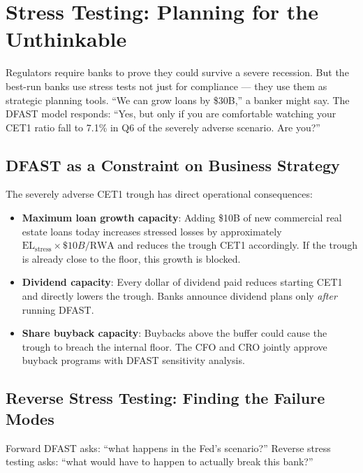 \documentclass[12pt,a4paper]{article}
\begin{document}
\section{Stress Testing: Planning for the Unthinkable}

Regulators require banks to prove they could survive a severe recession.
But the best-run banks use stress tests not just for compliance --- they use
them as strategic planning tools.  ``We can grow loans by \$30B,'' a banker
might say.  The DFAST model responds: ``Yes, but only if you are comfortable
watching your CET1 ratio fall to 7.1\% in Q6 of the severely adverse
scenario.  Are you?''

\subsection{DFAST as a Constraint on Business Strategy}

The severely adverse CET1 trough has direct operational consequences:

\begin{itemize}[noitemsep]
  \item \textbf{Maximum loan growth capacity}: Adding \$10B of new commercial
        real estate loans today increases stressed losses by approximately
        $\text{EL}_{\text{stress}} \times \$10B / \text{RWA}$ and reduces the
        trough CET1 accordingly.  If the trough is already close to the floor,
        this growth is blocked.
  \item \textbf{Dividend capacity}: Every dollar of dividend paid reduces
        starting CET1 and directly lowers the trough.  Banks announce dividend
        plans only \emph{after} running DFAST.
  \item \textbf{Share buyback capacity}: Buybacks above the buffer could cause
        the trough to breach the internal floor.  The CFO and CRO jointly
        approve buyback programs with DFAST sensitivity analysis.
\end{itemize}

\subsection{Reverse Stress Testing: Finding the Failure Modes}

Forward DFAST asks: ``what happens in the Fed's scenario?''  Reverse stress
testing asks: ``what would have to happen to actually break this bank?''
\end{document}
